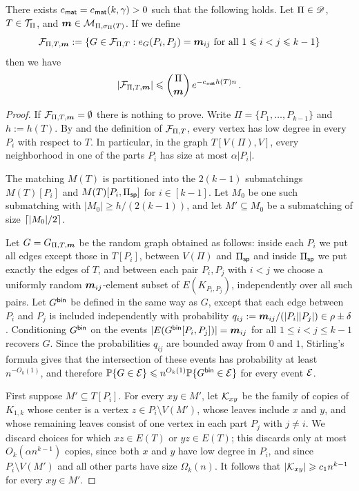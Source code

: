 \begin{lemma}\label{lemma:super-FPiT}
There exists $c_\mat=c_\mat(k,\gamma)>0$ such that the following holds. Let $\Pi\in\sD$, $T\in\cT_\Pi$, and $\bsm\in\cM_{\Pi,\sigma_\Pi(T)}$. If we define
$$\cF_{\Pi,T,\bsm}:=\left\{G\in\cF_{\Pi,T}:e_G(P_i,P_j)=\bsm_{ij}\text{ for all }1\leq i<j\leq k-1\right\}$$
then we have
$$\abs{\cF_{\Pi,T,\bsm}} \leq \binom{\Pi}{\bsm}\,e^{-c_\mat h(T)n}\,.$$
\end{lemma}
\begin{proof}
If $\cF_{\Pi,T,\bsm}=\emptyset$ there is nothing to prove. Write $\Pi=\{P_1,\dots,P_{k-1}\}$ and $h:=h(T)$. By  and the definition of $\cF_{\Pi,T}$, every vertex has low degree in every $P_i$ with respect to $T$. In particular, in the graph $T[V(\Pi),V]$, every neighborhood in one of the parts $P_i$ has size at most $\alpha|P_i|$.

The matching $M(T)$ is partitioned into the $2(k-1)$ submatchings $M(T)[P_i]$ and $M(T)[P_i,\Pi_\sparse]$ for $i\in[k-1]$. Let $M_0$ be one such submatching with $|M_0|\geq h/(2(k-1))$, and let $M'\subseteq M_0$ be a submatching of size $\ceil*{|M_0|/2}$.

Let $G=G_{\Pi,T,\bsm}$ be the random graph obtained as follows: inside each $P_i$ we put all edges except those in $T[P_i]$, between $V(\Pi)$ and $\Pi_\sparse$ and inside $\Pi_\sparse$ we put exactly the edges of $T$, and between each pair $P_i,P_j$ with $i<j$ we choose a uniformly random $\bsm_{ij}$-element subset of $E(K_{P_i,P_j})$, independently over all such pairs. Let $G^\bin$ be defined in the same way as $G$, except that each edge between $P_i$ and $P_j$ is included independently with probability $q_{ij}:=\bsm_{ij}/(|P_i||P_j|)\in\rho\pm\delta$. Conditioning $G^\bin$ on the events $|E(G^\bin[P_i,P_j])|=\bsm_{ij}$ for all $1\leq i<j\leq k-1$ recovers $G$. Since the probabilities $q_{ij}$ are bounded away from $0$ and $1$, Stirling's formula gives that the intersection of these events has probability at least $n^{-O_k(1)}$, and therefore $\bbP\{G\in\cE\}\leq n^{O_k(1)}\bbP\{G^\bin\in\cE\}$ for every event $\cE$.

First suppose $M'\subseteq T[P_i]$. For every $xy\in M'$, let $\cK_{xy}$ be the family of copies of $K_{1,k}$ whose center is a vertex $z\in P_i\setminus V(M')$, whose leaves include $x$ and $y$, and whose remaining leaves consist of one vertex in each part $P_j$ with $j\neq i$. We discard choices for which $xz\in E(T)$ or $yz\in E(T)$; this discards only at most $O_k(\alpha n^{k-1})$ copies, since both $x$ and $y$ have low degree in $P_i$, and since $P_i\setminus V(M')$ and all other parts have size $\Omega_k(n)$. It follows that $|\cK_{xy}|\geq c_1n^{k-1}$ for every $xy\in M'$.


\end{proof}
